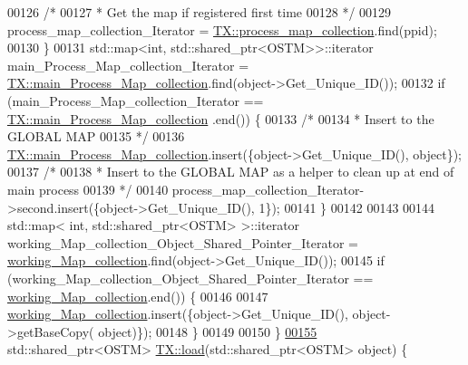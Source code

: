 \begin{DoxyCode}
00126         \textcolor{comment}{/*}
00127 \textcolor{comment}{         * Get the map if registered first time}
00128 \textcolor{comment}{         */}
00129         process\_map\_collection\_Iterator = \hyperlink{class_t_x_aea5b8eedcd5059384155576b3979a5f6_aea5b8eedcd5059384155576b3979a5f6}{TX::process\_map\_collection}.find(ppid);
00130     \}
00131     std::map<int, std::shared\_ptr<OSTM>>::iterator main\_Process\_Map\_collection\_Iterator = 
      \hyperlink{class_t_x_a1a45d726894190695314464d7cd97c29_a1a45d726894190695314464d7cd97c29}{TX::main\_Process\_Map\_collection}.find(object->Get\_Unique\_ID());
00132     \textcolor{keywordflow}{if} (main\_Process\_Map\_collection\_Iterator == \hyperlink{class_t_x_a1a45d726894190695314464d7cd97c29_a1a45d726894190695314464d7cd97c29}{TX::main\_Process\_Map\_collection}
      .end()) \{
00133         \textcolor{comment}{/*}
00134 \textcolor{comment}{         * Insert to the GLOBAL MAP }
00135 \textcolor{comment}{         */}
00136         \hyperlink{class_t_x_a1a45d726894190695314464d7cd97c29_a1a45d726894190695314464d7cd97c29}{TX::main\_Process\_Map\_collection}.insert(\{\textcolor{keywordtype}{object}->Get\_Unique\_ID(), \textcolor{keywordtype}{
      object}\});
00137         \textcolor{comment}{/*}
00138 \textcolor{comment}{         * Insert to the GLOBAL MAP as a helper to clean up at end of main process }
00139 \textcolor{comment}{         */}
00140         process\_map\_collection\_Iterator->second.insert(\{\textcolor{keywordtype}{object}->Get\_Unique\_ID(), 1\});
00141     \} 
00142 
00143 
00144     std::map< int, std::shared\_ptr<OSTM> >::iterator working\_Map\_collection\_Object\_Shared\_Pointer\_Iterator 
      = \hyperlink{class_t_x_a81aafda16e2f20e36ec6c68e584668ff_a81aafda16e2f20e36ec6c68e584668ff}{working\_Map\_collection}.find(object->Get\_Unique\_ID());
00145     \textcolor{keywordflow}{if} (working\_Map\_collection\_Object\_Shared\_Pointer\_Iterator == 
      \hyperlink{class_t_x_a81aafda16e2f20e36ec6c68e584668ff_a81aafda16e2f20e36ec6c68e584668ff}{working\_Map\_collection}.end()) \{
00146 
00147         \hyperlink{class_t_x_a81aafda16e2f20e36ec6c68e584668ff_a81aafda16e2f20e36ec6c68e584668ff}{working\_Map\_collection}.insert(\{\textcolor{keywordtype}{object}->Get\_Unique\_ID(), \textcolor{keywordtype}{object}->getBaseCopy(\textcolor{keywordtype}{
      object})\});
00148     \}
00149 
00150 \}
\hypertarget{_t_x_8cpp_source.tex_l00155}{}\hyperlink{class_t_x_a1d78262b8831ddd042ed491f2e600e24_a1d78262b8831ddd042ed491f2e600e24}{00155} std::shared\_ptr<OSTM> \hyperlink{class_t_x_a1d78262b8831ddd042ed491f2e600e24_a1d78262b8831ddd042ed491f2e600e24}{TX::load}(std::shared\_ptr<OSTM> \textcolor{keywordtype}{object}) \{

\end{DoxyCode}
